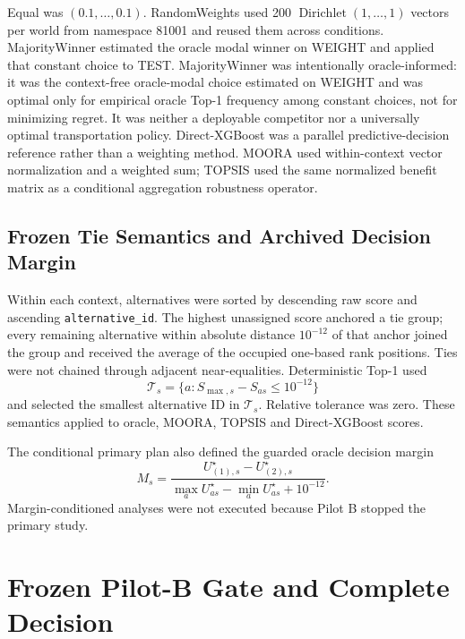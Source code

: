 \documentclass[runningheads]{llncs}
\begin{document}
Equal was $(0.1,\ldots,0.1)$. RandomWeights used 200
$\operatorname{Dirichlet}(1,\ldots,1)$ vectors per world from namespace 81001 and reused them
across conditions. MajorityWinner estimated the oracle modal winner on WEIGHT and applied that
constant choice to TEST. MajorityWinner was intentionally oracle-informed: it was the
context-free oracle-modal choice estimated on WEIGHT and was optimal only for empirical oracle
Top-1 frequency among constant choices, not for minimizing regret. It was neither a deployable
competitor nor a universally optimal transportation policy. Direct-XGBoost was a parallel
predictive-decision reference rather than a weighting
method. MOORA used within-context vector normalization and a weighted sum; TOPSIS used the same
normalized benefit matrix as a conditional aggregation robustness operator.

\subsection{Frozen Tie Semantics and Archived Decision Margin}

Within each context, alternatives were sorted by descending raw score and ascending
\texttt{alternative\_id}. The highest unassigned score anchored a tie group; every remaining
alternative within absolute distance $10^{-12}$ of that anchor joined the group and received
the average of the occupied one-based rank positions. Ties were not chained through adjacent
near-equalities. Deterministic Top-1 used
\begin{equation}
\mathcal T_s=\{a:S_{\max,s}-S_{as}\le10^{-12}\}
\label{supp:eq:top1tieset}
\end{equation}
and selected the smallest alternative ID in $\mathcal T_s$. Relative tolerance was zero. These
semantics applied to oracle, MOORA, TOPSIS and Direct-XGBoost scores.

The conditional primary plan also defined the guarded oracle decision margin
\begin{equation}
M_s=\frac{U_{(1),s}^\star-U_{(2),s}^\star}
{\max_aU_{as}^\star-\min_aU_{as}^\star+10^{-12}}.
\label{supp:eq:margin}
\end{equation}
Margin-conditioned analyses were not executed because Pilot B stopped the primary study.

\section{Frozen Pilot-B Gate and Complete Decision}
\end{document}
